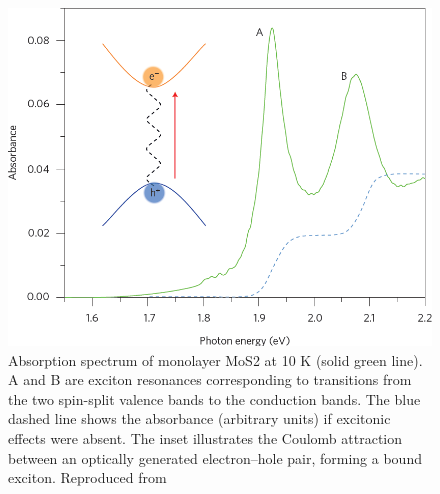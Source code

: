 \begin{figure}[!h]
	\begin{center}
		\includegraphics[scale=0.45]{TMDCAbsorption.png}
		\caption{Absorption spectrum of monolayer MoS2 at 10 K (solid green line). A and B are exciton resonances corresponding to transitions from the two spin-split valence bands to the conduction bands. The blue dashed line shows the absorbance (arbitrary units) if excitonic effects were absent. The inset illustrates the Coulomb attraction between an optically generated electron–hole pair, forming a bound exciton. Reproduced from \cite{Mak2016}}
		\label{fig:TMDCAbsorption}
	\end{center}
\end{figure}

